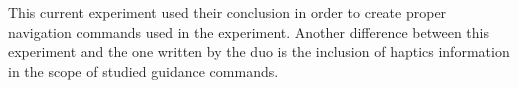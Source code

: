 

\FloatBarrier

This current experiment used their conclusion in order to create proper navigation commands used in the experiment. Another difference between this experiment and the one written by the duo is the inclusion of haptics information in the scope of studied guidance commands.